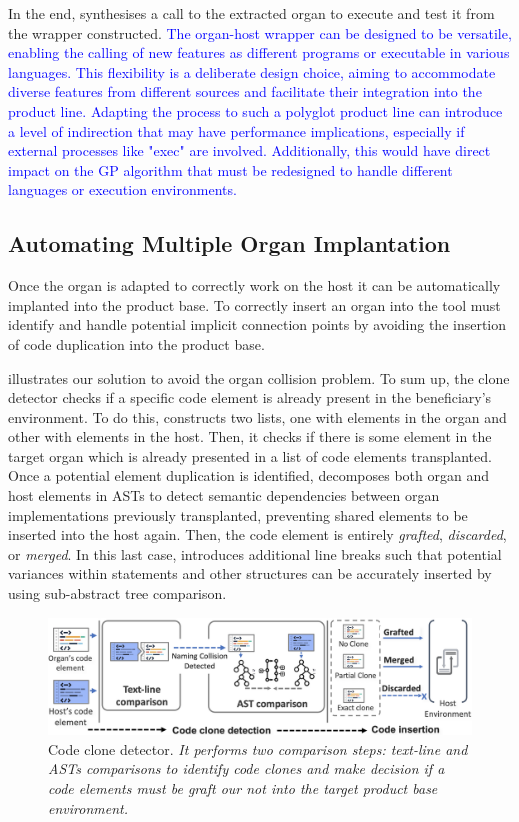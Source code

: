 In the end, \prodscalpel synthesises a call to the extracted organ to execute and test it from the wrapper constructed.
\textcolor{blue}{The organ-host wrapper can be designed to be versatile, enabling the calling of new features as different programs or executable in various languages. This flexibility is a deliberate design choice, aiming to accommodate diverse features from different sources and facilitate their integration into the product line.
Adapting the process to such a polyglot product line can introduce a level of indirection that may have performance implications, especially if external processes like "exec" are involved. 
Additionally, this would have direct impact on the GP algorithm that must be redesigned to handle different languages or execution environments.}

\subsection{Automating Multiple Organ Implantation}
\label{sec:Implantation}


Once the organ is adapted to correctly work on the host it can be automatically implanted into the product base. To correctly insert an organ into the tool must identify and handle potential implicit connection points by avoiding the insertion of code duplication into the product base.

 illustrates our solution to avoid the organ collision problem. To sum up, the clone detector checks if a specific code element is already present in the beneficiary's environment. To do this, \prodscalpel constructs two lists, one with elements in the organ and other with elements in the host. Then, it checks if there is some element in the target organ which is already presented in a list of code elements transplanted. Once a potential element duplication is identified, \prodscalpel decomposes both organ and host elements in ASTs to detect semantic dependencies between organ implementations previously transplanted, preventing shared elements to be inserted into the host again. Then, the code element is entirely \emph{grafted}, \emph{discarded}, or \emph{merged}. In this last case, \prodscalpel introduces additional line breaks such that potential variances within statements and other structures can be accurately inserted by using sub-abstract tree comparison.

\begin{figure}[t]
	\centering \includegraphics[width=\textwidth]{images/clone_detector.png}
	\caption{Code clone detector. \textit{It performs two comparison steps: text-line and ASTs comparisons to identify code clones and make decision if a code elements must be graft our not into the target product base environment.}}
	\label{fig:code_clone_analysis}
\end{figure} 

